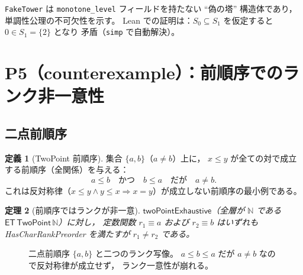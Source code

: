 \documentclass[a4paper,11pt]{ltjsarticle}
\theoremstyle{definition}
\newtheorem{definition}{定義}[section]
\theoremstyle{plain}
\newtheorem{theorem}[definition]{定理}
\theoremstyle{remark}
\newcommand{\ET}{\mathsf{ET}}    %
\begin{document}
\begin{counterpointbox}
\texttt{FakeTower} は \texttt{monotone\_level} フィールドを持たない
``偽の塔'' 構造体であり，単調性公理の不可欠性を示す。
Lean での証明は：$S_0 \subseteq S_1$ を仮定すると $0 \in S_1 = \{2\}$ となり
矛盾（\texttt{simp} で自動解決）。
\end{counterpointbox}

\section{P5（counterexample）：前順序でのランク非一意性}\label{sec:preorder}

\subsection{二点前順序}

\begin{definition}[TwoPoint 前順序]\label{def:twopoint}
集合 $\{a, b\}$（$a \neq b$）上に，
$x \leq y$ が全ての対で成立する前順序（全関係）を与える：
\[
  a \leq b \quad \text{かつ} \quad b \leq a \quad \text{だが} \quad a \neq b.
\]
これは反対称律（$x \leq y \wedge y \leq x \Rightarrow x = y$）が成立しない前順序の最小例である。
\end{definition}

\begin{theorem}[前順序ではランクが非一意]\label{thm:rank-not-unique}
$\mathsf{twoPointExhaustive}$（全層が $\mathbb{N}$ である $\ET\,\mathsf{TwoPoint}\,\mathbb{N}$）に対し，
定数関数 $r_1 \equiv a$ および $r_2 \equiv b$ はいずれも
HasCharRankPreorder を満たすが $r_1 \neq r_2$ である。
\end{theorem}

\begin{figure}[H]
\centering
{}
\caption{二点前順序 $\{a,b\}$ と二つのランク写像。
  $a \leq b \leq a$ だが $a \neq b$ なので反対称律が成立せず，
  ランク一意性が崩れる。}
\label{fig:rank-nonunique}
\end{figure}
\end{document}
